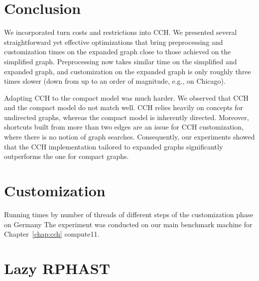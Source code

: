 \documentclass[a4paper, english, cleveref]{lipics-v2021}
\begin{document}

\section{Conclusion}
\label{sec:conclusion}

We incorporated turn costs and restrictions into CCH. We presented several straightforward yet effective optimizations that bring preprocessing and customization times on the expanded graph close to those achieved on the simplified graph. Preprocessing now takes similar time on the simplified and expanded graph, and customization on the expanded graph is only roughly three times slower (down from up to an order of magnitude, e.g., on Chicago).

Adapting CCH to the compact model was much harder. We observed that CCH and the compact model do not match well. CCH relies heavily on concepts for undirected graphs, whereas the compact model is inherently directed. Moreover, shortcuts built from more than two edges are an issue for CCH customization, where there is no notion of graph searches. Consequently, our experiments showed that the CCH implementation tailored to expanded graphs significantly outperforms the one for compact graphs.



\appendix
\section{Customization}

\begin{table}
\centering
\caption{
Running times by number of threads of different steps of the customization phase on Germany
The experiment was conducted on our main benchmark machine for Chapter~\ref{chap:cch} compute11.
}\label{tab:customization_ger}

\end{table}

\section{Lazy RPHAST}
\end{document}
